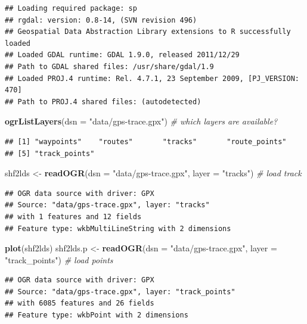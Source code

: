 \documentclass[]{article}
\newenvironment{Shaded}{}{}
\newcommand{\KeywordTok}[1]{\textcolor[rgb]{0.00,0.44,0.13}{\textbf{{#1}}}}
\newcommand{\DataTypeTok}[1]{\textcolor[rgb]{0.56,0.13,0.00}{{#1}}}
\newcommand{\StringTok}[1]{\textcolor[rgb]{0.25,0.44,0.63}{{#1}}}
\newcommand{\CommentTok}[1]{\textcolor[rgb]{0.38,0.63,0.69}{\textit{{#1}}}}
\newcommand{\NormalTok}[1]{{#1}}
\begin{document}
\begin{verbatim}
## Loading required package: sp
## rgdal: version: 0.8-14, (SVN revision 496)
## Geospatial Data Abstraction Library extensions to R successfully loaded
## Loaded GDAL runtime: GDAL 1.9.0, released 2011/12/29
## Path to GDAL shared files: /usr/share/gdal/1.9
## Loaded PROJ.4 runtime: Rel. 4.7.1, 23 September 2009, [PJ_VERSION: 470]
## Path to PROJ.4 shared files: (autodetected)
\end{verbatim}

\begin{Shaded}
\begin{Highlighting}[]
\KeywordTok{ogrListLayers}\NormalTok{(}\DataTypeTok{dsn =} \StringTok{"data/gps-trace.gpx"}\NormalTok{)  }\CommentTok{# which layers are available?}
\end{Highlighting}
\end{Shaded}

\begin{verbatim}
## [1] "waypoints"    "routes"       "tracks"       "route_points"
## [5] "track_points"
\end{verbatim}

\begin{Shaded}
\begin{Highlighting}[]
\NormalTok{shf2lds <-}\StringTok{ }\KeywordTok{readOGR}\NormalTok{(}\DataTypeTok{dsn =} \StringTok{"data/gps-trace.gpx"}\NormalTok{, }\DataTypeTok{layer =} \StringTok{"tracks"}\NormalTok{)  }\CommentTok{# load track}
\end{Highlighting}
\end{Shaded}

\begin{verbatim}
## OGR data source with driver: GPX 
## Source: "data/gps-trace.gpx", layer: "tracks"
## with 1 features and 12 fields
## Feature type: wkbMultiLineString with 2 dimensions
\end{verbatim}

\begin{Shaded}
\begin{Highlighting}[]
\KeywordTok{plot}\NormalTok{(shf2lds)}
\NormalTok{shf2lds.p <-}\StringTok{ }\KeywordTok{readOGR}\NormalTok{(}\DataTypeTok{dsn =} \StringTok{"data/gps-trace.gpx"}\NormalTok{, }\DataTypeTok{layer =} \StringTok{"track_points"}\NormalTok{)  }\CommentTok{# load points}
\end{Highlighting}
\end{Shaded}

\begin{verbatim}
## OGR data source with driver: GPX 
## Source: "data/gps-trace.gpx", layer: "track_points"
## with 6085 features and 26 fields
## Feature type: wkbPoint with 2 dimensions
\end{verbatim}
\end{document}
